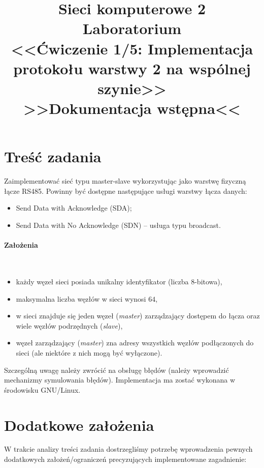 \documentclass[a4paper,12pt]{article}
\title{
    \textbf{Sieci komputerowe 2 \\ Laboratorium} \\
    {\normalsize<<Ćwiczenie 1/5: Implementacja protokołu warstwy 2 na wspólnej szynie>>} \\
    {\large{>>Dokumentacja wstępna<<}}
}
\author{
    \makebox[8em][c]{Piotr Bałut} \and
    \makebox[8em][c]{Maciej Rubikowski} \and
    \makebox[8em][c]{Tomasz Pieczerak}
}
\begin{document}
\maketitle

\section{Treść zadania}
Zaimplementować sieć typu master-slave wykorzystując jako warstwę fizyczną
łącze RS485. Powinny być dostępne następujące usługi warstwy łącza danych:

\begin{itemize}
  \item Send Data with Acknowledge (SDA);
  \item Send Data with No Acknowledge (SDN) -- usługa typu broadcast.
\end{itemize}

\paragraph{Założenia}\

\begin{itemize}
  \item każdy węzeł sieci posiada unikalny identyfikator (liczba 8-bitowa),
  \item maksymalna liczba węzłów w sieci wynosi $64$,
  \item w sieci znajduje się jeden węzeł (\emph{master}) zarządzający
        dostępem do łącza oraz wiele węzłów podrzędnych (\emph{slave}),
  \item węzeł zarządzający (\emph{master}) zna adresy wszystkich węzłów
        podłączonych do sieci (ale niektóre z nich mogą być wyłączone).
\end{itemize}

Szczególną uwagę należy zwrócić na obsługę błędów (należy wprowadzić
mechanizmy symulowania błędów). Implementacja ma zostać wykonana w środowisku
GNU/Linux.

\section{Dodatkowe założenia}

W trakcie analizy treści zadania dostrzegliśmy potrzebę wprowadzenia pewnych
dodatkowych założeń/ograniczeń precyzujących implementowane zagadnienie:
\end{document}
